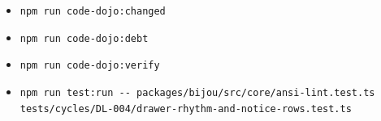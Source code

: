 \begin{itemize}
\item
  \texttt{n\allowbreak{}p\allowbreak{}m\allowbreak{} \allowbreak{}r\allowbreak{}u\allowbreak{}n\allowbreak{} \allowbreak{}c\allowbreak{}o\allowbreak{}d\allowbreak{}e\allowbreak{}-\allowbreak{}d\allowbreak{}o\allowbreak{}j\allowbreak{}o\allowbreak{}:\allowbreak{}c\allowbreak{}h\allowbreak{}a\allowbreak{}n\allowbreak{}g\allowbreak{}e\allowbreak{}d}
\item
  \texttt{n\allowbreak{}p\allowbreak{}m\allowbreak{} \allowbreak{}r\allowbreak{}u\allowbreak{}n\allowbreak{} \allowbreak{}c\allowbreak{}o\allowbreak{}d\allowbreak{}e\allowbreak{}-\allowbreak{}d\allowbreak{}o\allowbreak{}j\allowbreak{}o\allowbreak{}:\allowbreak{}d\allowbreak{}e\allowbreak{}b\allowbreak{}t}
\item
  \texttt{n\allowbreak{}p\allowbreak{}m\allowbreak{} \allowbreak{}r\allowbreak{}u\allowbreak{}n\allowbreak{} \allowbreak{}c\allowbreak{}o\allowbreak{}d\allowbreak{}e\allowbreak{}-\allowbreak{}d\allowbreak{}o\allowbreak{}j\allowbreak{}o\allowbreak{}:\allowbreak{}v\allowbreak{}e\allowbreak{}r\allowbreak{}i\allowbreak{}f\allowbreak{}y}
\item
  \texttt{n\allowbreak{}p\allowbreak{}m\allowbreak{} \allowbreak{}r\allowbreak{}u\allowbreak{}n\allowbreak{} \allowbreak{}t\allowbreak{}e\allowbreak{}s\allowbreak{}t\allowbreak{}:\allowbreak{}r\allowbreak{}u\allowbreak{}n\allowbreak{} \allowbreak{}-\allowbreak{}-\allowbreak{} \allowbreak{}p\allowbreak{}a\allowbreak{}c\allowbreak{}k\allowbreak{}a\allowbreak{}g\allowbreak{}e\allowbreak{}s\allowbreak{}/\allowbreak{}b\allowbreak{}i\allowbreak{}j\allowbreak{}o\allowbreak{}u\allowbreak{}/\allowbreak{}s\allowbreak{}r\allowbreak{}c\allowbreak{}/\allowbreak{}c\allowbreak{}o\allowbreak{}r\allowbreak{}e\allowbreak{}/\allowbreak{}a\allowbreak{}n\allowbreak{}s\allowbreak{}i\allowbreak{}-\allowbreak{}l\allowbreak{}i\allowbreak{}n\allowbreak{}t\allowbreak{}.\allowbreak{}t\allowbreak{}e\allowbreak{}s\allowbreak{}t\allowbreak{}.\allowbreak{}t\allowbreak{}s\allowbreak{} \allowbreak{}t\allowbreak{}e\allowbreak{}s\allowbreak{}t\allowbreak{}s\allowbreak{}/\allowbreak{}c\allowbreak{}y\allowbreak{}c\allowbreak{}l\allowbreak{}e\allowbreak{}s\allowbreak{}/\allowbreak{}D\allowbreak{}L\allowbreak{}-\allowbreak{}0\allowbreak{}0\allowbreak{}4\allowbreak{}/\allowbreak{}d\allowbreak{}r\allowbreak{}a\allowbreak{}w\allowbreak{}e\allowbreak{}r\allowbreak{}-\allowbreak{}r\allowbreak{}h\allowbreak{}y\allowbreak{}t\allowbreak{}h\allowbreak{}m\allowbreak{}-\allowbreak{}a\allowbreak{}n\allowbreak{}d\allowbreak{}-\allowbreak{}n\allowbreak{}o\allowbreak{}t\allowbreak{}i\allowbreak{}c\allowbreak{}e\allowbreak{}-\allowbreak{}r\allowbreak{}o\allowbreak{}w\allowbreak{}s\allowbreak{}.\allowbreak{}t\allowbreak{}e\allowbreak{}s\allowbreak{}t\allowbreak{}.\allowbreak{}t\allowbreak{}s}

\end{itemize}
